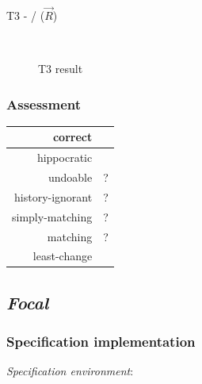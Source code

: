 \documentclass{article}
\newcommand{\cmark}{\ding{51}}%
\begin{document}
~\\

T3 -  /  ($\overrightarrow{R}$)
\begin{figure}[ht]
    \centering
    \mbox{\quad\qquad\quad
          }
    \caption{T3 result}
    \label{fig:T3}
\end{figure}


\subsubsection{Assessment}

\begin{center}
\begin{tabular}{| r | c |}
  \hline                        
  correct & \cmark\\
  \hline
  hippocratic & \cmark\\
  \hline 
  undoable & ?\\
  \hline 
  history-ignorant & ?\\
  \hline 
  simply-matching & ?\\
  \hline 
  matching & ?\\
  \hline 
  least-change & \cmark\\
  \hline   
\end{tabular}
\end{center}

\pagebreak
\subsection{\textit{Focal}}
\subsubsection{Specification implementation}
\textit{Specification environment}:
~\\
\end{document}
